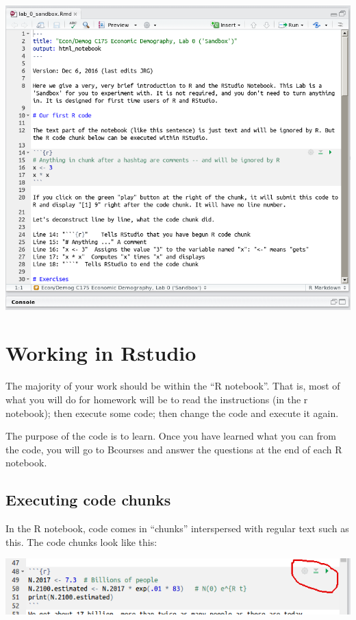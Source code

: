 \documentclass[11pt]{article}
\begin{document}
\begin{itemize}
\includegraphics[scale=.3]{RstudioRnotebook}


\end{itemize}

\section{Working in Rstudio}

The majority of your work should be within the ``R notebook''.  That is, most of what you will do for homework will be to read the instructions (in the r notebook); then execute some code; then change the code and execute it again.

The purpose of the code is to learn. Once you have learned what you can from the code, you will go to Bcourses and answer the questions at the end of each R notebook.   

\subsection{Executing code chunks}

In the R notebook, code comes in ``chunks'' interspersed with regular text such as this.  The code chunks look like this:

\includegraphics[scale=.5]{RstudioChunk}
\end{document}
